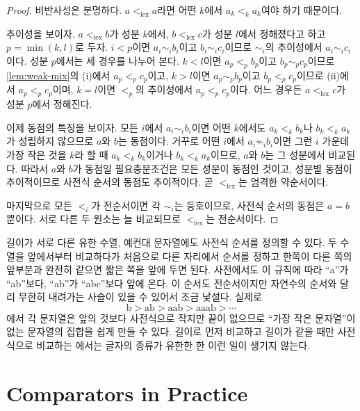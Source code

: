\begin{proof}
비반사성은 분명하다. $a<_{\mathrm{lex}}a$라면 어떤 $k$에서 $a_k<_k a_k$여야 하기 때문이다.

추이성을 보이자. $a<_{\mathrm{lex}}b$가 성분 $k$에서, $b<_{\mathrm{lex}}c$가 성분 $l$에서 정해졌다고 하고 $p=\min(k,l)$로 두자. $i<p$이면 $a_i\sim_i b_i$이고 $b_i\sim_i c_i$이므로 $\sim_i$의 추이성에서 $a_i\sim_i c_i$이다. 성분 $p$에서는 세 경우를 나누어 본다. $k<l$이면 $a_p<_p b_p$이고 $b_p\sim_p c_p$이므로 \cref{lem:weak-mix}의 (i)에서 $a_p<_p c_p$이고, $k>l$이면 $a_p\sim_p b_p$이고 $b_p<_p c_p$이므로 (ii)에서 $a_p<_p c_p$이며, $k=l$이면 $<_p$의 추이성에서 $a_p<_p c_p$이다. 어느 경우든 $a<_{\mathrm{lex}}c$가 성분 $p$에서 정해진다.

이제 동점의 특징을 보이자. 모든 $i$에서 $a_i\sim_i b_i$이면 어떤 $k$에서도 $a_k<_k b_k$나 $b_k<_k a_k$가 성립하지 않으므로 $a$와 $b$는 동점이다. 거꾸로 어떤 $i$에서 $a_i\not\sim_i b_i$이면 그런 $i$ 가운데 가장 작은 것을 $k$라 할 때 $a_k<_k b_k$이거나 $b_k<_k a_k$이므로, $a$와 $b$는 그 성분에서 비교된다. 따라서 $a$와 $b$가 동점일 필요충분조건은 모든 성분이 동점인 것이고, 성분별 동점이 추이적이므로 사전식 순서의 동점도 추이적이다. 곧 $<_{\mathrm{lex}}$는 엄격한 약순서이다.

마지막으로 모든 $<_i$가 전순서이면 각 $\sim_i$는 등호이므로, 사전식 순서의 동점은 $a=b$뿐이다. 서로 다른 두 원소는 늘 비교되므로 $<_{\mathrm{lex}}$는 전순서이다.
\end{proof}

길이가 서로 다른 유한 수열, 예컨대 문자열에도 사전식 순서를 정의할 수 있다. 두 수열을 앞에서부터 비교하다가 처음으로 다른 자리에서 순서를 정하고 한쪽이 다른 쪽의 앞부분과 완전히 같으면 짧은 쪽을 앞에 두면 된다. 사전에서도 이 규칙에 따라 ``a''가 ``ab''보다, ``ab''가 ``abc''보다 앞에 온다. 이 순서도 전순서이지만 자연수의 순서와 달리 무한히 내려가는 사슬이 있을 수 있어서 조금 낯설다. 실제로
\[
\text{b}>\text{ab}>\text{aab}>\text{aaab}>\cdots
\]
에서 각 문자열은 앞의 것보다 사전식으로 작지만 끝이 없으므로 ``가장 작은 문자열''이 없는 문자열의 집합을 쉽게 만들 수 있다. 길이로 먼저 비교하고 길이가 같을 때만 사전식으로 비교하는 에서는 글자의 종류가 유한한 한 이런 일이 생기지 않는다.



\section{Comparators in Practice}
\label{sec:comparators}

